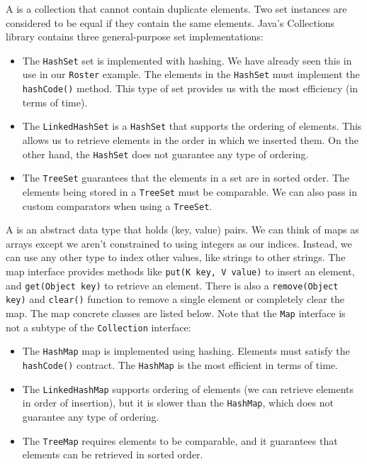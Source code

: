 A  is a collection that cannot contain duplicate elements. Two set instances are considered to be equal if they contain the same elements. Java's Collections library contains three general-purpose set implementations:
\begin{itemize}
    \item The \verb!HashSet! set is implemented with hashing. We have already seen this in use in our \verb!Roster! example. The elements in the \verb!HashSet! must implement the \verb!hashCode()! method. This type of set provides us with the most efficiency (in terms of time). 
    \item The \verb!LinkedHashSet! is a \verb!HashSet! that supports the ordering of elements. This allows us to retrieve elements in the order in which we inserted them. On the other hand, the \verb!HashSet! does not guarantee any type of ordering. 
    \item The \verb!TreeSet! guarantees that the elements in a set are in sorted order. The elements being stored in a \verb!TreeSet! must be comparable. We can also pass in custom comparators when using a \verb!TreeSet!. 
\end{itemize}

A  is an abstract data type that holds (key, value) pairs. We can think of maps as arrays except we aren't constrained to using integers as our indices. Instead, we can use any other type to index other values, like strings to other strings. The map interface provides methods like \verb!put(K key, V value)! to insert an element, and \verb!get(Object key)! to retrieve an element. There is also a \verb!remove(Object key)! and \verb!clear()! function to remove a single element or completely clear the map. The map concrete classes are listed below. Note that the \verb!Map! interface is not a subtype of the \verb!Collection! interface:

\begin{itemize}
\item The \verb!HashMap! map is implemented using hashing. Elements must satisfy the \verb!hashCode()! contract. The \verb!HashMap! is the most efficient in terms of time.
\item The \verb!LinkedHashMap! supports ordering of elements (we can retrieve elements in order of insertion), but it is slower than the \verb!HashMap!, which does not guarantee any type of ordering. 
\item The \verb!TreeMap! requires elements to be comparable, and it guarantees that elements can be retrieved in sorted order.
\end{itemize}

